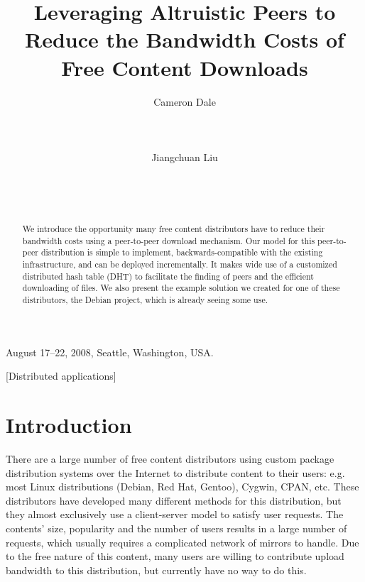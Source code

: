 \documentclass{sig-alt-release2}
\begin{document}
 {August 17--22, 2008, Seattle, Washington, USA.} 

\title{Leveraging Altruistic Peers to Reduce the Bandwidth Costs of Free Content Downloads}
\author{
\alignauthor Cameron Dale\\
	\\
	\\
	\\
\alignauthor Jiangchuan Liu\\
	\\
	\\
	\\
}

\maketitle

\begin{abstract}
We introduce the opportunity many free content distributors have to
reduce their bandwidth costs using a peer-to-peer download
mechanism. Our model for this peer-to-peer distribution is simple to
implement, backwards-compatible with the existing infrastructure,
and can be deployed incrementally. It makes wide use of a customized
distributed hash table (DHT) to facilitate the finding of peers and
the efficient downloading of files. We also present the example
solution we created for one of these distributors, the Debian
project, which is already seeing some use.
\end{abstract}

[Distributed applications]

\section{Introduction}
\label{intro}

There are a large number of free content distributors using custom
package distribution systems over the Internet to distribute content
to their users: e.g. most Linux distributions (Debian, Red Hat,
Gentoo), Cygwin, CPAN, etc.
These distributors have developed many different
methods for this distribution, but they almost exclusively use a
client-server model to satisfy user requests. The contents' size,
popularity and the number of users results in a large number of
requests, which usually requires a complicated network of mirrors to handle. Due
to the free nature of this content, many users are willing
to contribute upload bandwidth to this distribution, but currently
have no way to do this.
\end{document}
